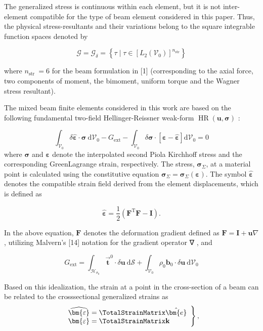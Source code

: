 The generalized stress is continuous within each element, but it is not inter-element compatible for the type of beam element considered in this paper. 
Thus, the physical stress-resultants and their variations belong to the square integrable function spaces denoted by

$$
\mathscr{G}=\mathscr{G}_\delta=\left\{\tau \mid \tau \in\left[L_2\left(\mathscr{V}_0\right)\right]^{n_{\mathrm{str}}}\right\}
$$

where $n_{\text {str }}=6$ for the beam formulation in [1] (corresponding to the axial force, two components of moment, the bimoment, uniform torque and the Wagner stress resultant).

The mixed beam finite elements considered in this work are based on the following fundamental two-field Hellinger-Reissner weak-form $\operatorname{HR}(\bm{u}, \bm{\sigma})$ :

$$
\int_{\mathscr{V}_0} \delta \widehat{\bm{\varepsilon}} \cdot \bm{\sigma} \mathrm{~d} \mathscr{V}_0-G_{\mathrm{ext}}-\int_{\mathscr{V}_0} \delta \bm{\sigma} \cdot[\bm{\varepsilon}-\widehat{\bm{\varepsilon}}] \mathrm{d} \mathscr{V}_0=0
$$
where $\bm{\sigma}$ and $\bm{\varepsilon}$ denote the interpolated second Piola Kirchhoff stress and the corresponding GreenLagrange strain, respectively. The stress, $\bm{\sigma}_{\Sigma}$, at a material point is calculated using the constitutive equation $\bm{\sigma}_{\Sigma}=\bm{\sigma}_{\Sigma}(\bm{\varepsilon})$. The symbol $\widehat{\bm{\varepsilon}}$ denotes the compatible strain field derived from the element displacements, which is defined as

$$
\widehat{\bm{\varepsilon}}=\frac{1}{2}\left(\mathbf{F}^{\mathrm{T}} \mathbf{F}-\mathbf{I}\right) .
$$


In the above equation, $\mathbf{F}$ denotes the deformation gradient defined as $\mathbf{F}=\mathbf{I}+\bm{u} \nabla$, utilizing Malvern's [14] notation for the gradient operator ∇ , and

$$
G_{\mathrm{ext}}=\int_{\mathscr{H}_{\sigma_0}} \overrightarrow{\mathbf{t}}^0 \cdot \delta \bm{u} \mathrm{~d} \mathscr{S}+\int_{\mathscr{V}_0} \rho_0 \mathbf{b}_0 \cdot \delta \bm{u} \mathrm{~d} \mathscr{V}_0
$$

Based on this idealization, the strain at a point in the cross-section of a beam can be related to the crosssectional generalized strains as
$$
\left.\begin{array}{l}
\widehat{\bm{\varepsilon}}=\TotalStrainMatrix \hat{\bm{e}} \\
\bm{\varepsilon}=\TotalStrainMatrix \mathbf{k}
\end{array}\right\},
$$

